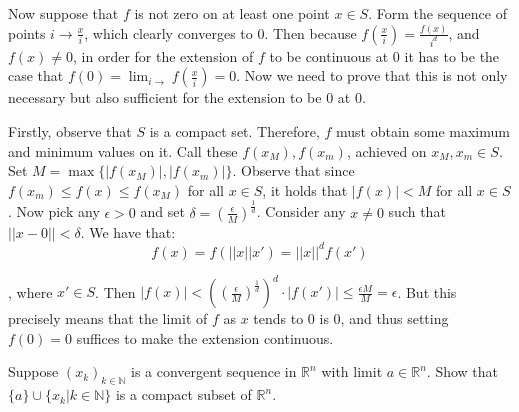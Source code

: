 \begin{solution}
\begin{itemize}
        Now suppose that $f$ is not zero on at least one point $x \in S$. Form the sequence of points $i \rightarrow \frac{x}{i}$, which clearly converges to 0. Then because $f(\frac{x}{i}) = \frac{f(x)}{i^d}$, and $f(x) \neq 0$, in order for the extension of $f$ to be continuous at 0 it has to be the case that $f(0) = \lim_{i \rightarrow} f(\frac{x}{i}) = 0$. Now we need to prove that this is not only necessary but also sufficient for the extension to be 0 at 0. 
        
        Firstly, observe that $S$ is a compact set. Therefore, $f$ must obtain some maximum and minimum values on it. Call these $f(x_M), f(x_m)$, achieved on $x_M, x_m \in S$. Set $M = \max\{\lvert f(x_M) \rvert, \lvert f(x_m)\rvert\}$. Observe that since $f(x_m) \leq f(x) \leq f(x_M)$ for all $x \in S$, it holds that $\lvert f(x) \rvert < M$ for all $x \in S$. Now pick any $\epsilon > 0$ and set $\delta = (\frac{\epsilon}{M})^{\frac{1}{d}}$. Consider any $x \neq 0$ such that $\lvert \lvert x - 0 \rvert \rvert < \delta$. We have that:
        $$f(x) = f(\lvert \lvert x \rvert \rvert x') = \lvert \lvert x \rvert \rvert^d f(x')$$

        , where $x' \in S$. Then $\lvert f(x) \rvert < ((\frac{\epsilon}{M})^{\frac{1}{d}})^d\cdot \lvert f(x') \rvert \leq \frac{\epsilon M}{M} = \epsilon$. But this precisely means that the limit of $f$ as $x$ tends to 0 is 0, and thus setting $f(0) = 0$ suffices to make the extension continuous.
    \end{itemize}
\end{solution}

\begin{exercise}{20}
    Suppose $(x_k)_{k \in \mathbb{N}}$ is a convergent sequence in $\mathbb{R}^n$ with limit $a \in \mathbb{R}^n$. Show that $\{a\}\cup\{ x_k \lvert k \in \mathbb{N} \}$ is a compact subset of $\mathbb{R}^n$.
\end{exercise}

